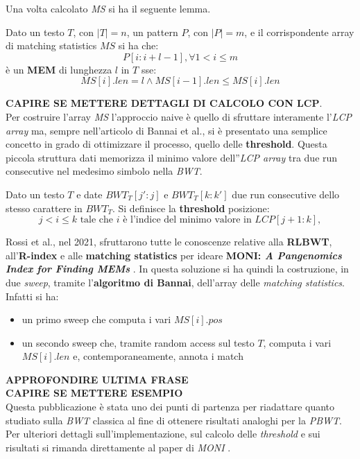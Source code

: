 Una volta calcolato \textit{MS} si ha il seguente lemma.
\begin{lemma}
  Dato un testo $T$, con $|T|=n$, un pattern $P$, con $|P|=m$, e il
  corrispondente array di matching statistics $MS$ si ha che:
  \[P[i:i+l-1],\forall 1<i\leq m\]
  è un \textbf{MEM} di lunghezza $l$ in $T$ sse:
  \[MS[i].len=l\land MS[i-1].len\leq MS[i].len\]
\end{lemma}
\textbf{CAPIRE SE METTERE DETTAGLI DI CALCOLO CON LCP}.\\
Per costruire l'array \textit{MS} l'approccio naive è quello di sfruttare
interamente l'\textit{LCP array} ma, sempre nell'articolo di Bannai et
al.\cite{bannai}, si è presentato una semplice concetto in grado di
ottimizzare il processo, quello delle \textbf{threshold}. Questa piccola
struttura dati memorizza il minimo valore dell''\textit{LCP array} tra due run
consecutive nel medesimo simbolo nella \textit{BWT}.
\begin{definizione}
  Dato un testo $T$ e date $BWT_T[j':j]$ e $BWT_T[k:k']$ due run consecutive
  dello stesso carattere in $BWT_T$. Si definisce la \textbf{threshold}
  posizione:
  \[j< i \leq k\mbox{ tale che } i\mbox{ è l'indice del minimo valore in
    }LCP[j+1:k],\] 
\end{definizione}
Rossi et al., nel 2021, sfruttarono tutte le conoscenze relative
alla \textbf{RLBWT}, all'\textbf{R-index} e alle \textbf{matching statistics}
per ideare \textbf{MONI:\textit{ A Pangenomics Index for Finding MEMs}}
\cite{moni}. In questa soluzione si ha quindi la costruzione, in due
\textit{sweep}, tramite l'\textbf{algoritmo di Bannai}, dell'array delle
\textit{matching statistics}. Infatti si ha:
\begin{itemize}
  \item un primo sweep che computa i vari $MS[i].pos$
  \item un secondo sweep che, tramite random access sul testo $T$, computa i
  vari $MS[i].len$ e, contemporaneamente, annota i match
\end{itemize}
\textbf{APPROFONDIRE ULTIMA FRASE}\\
\textbf{CAPIRE SE METTERE ESEMPIO}\\
Questa pubblicazione è stata uno dei punti di partenza per
riadattare quanto studiato sulla \textit{BWT} classica al fine di ottenere
risultati analoghi per la \textit{PBWT}.\\
Per ulteriori dettagli sull'implementazione, sul calcolo delle
\textit{threshold} e sui risultati si rimanda direttamente al paper di
\textit{MONI} \cite{moni}.
